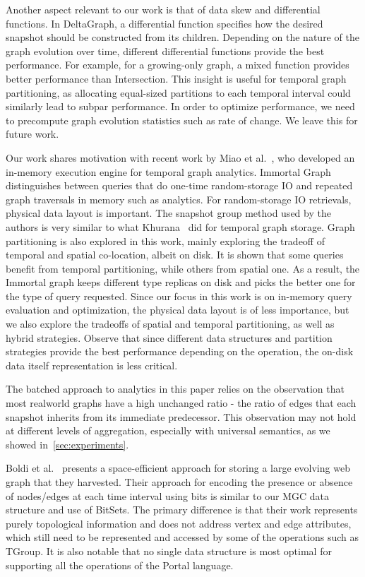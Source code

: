 Another aspect relevant to our work is that of data skew and
differential functions.  In DeltaGraph, a differential function
specifies how the desired snapshot should be constructed from its
children.  Depending on the nature of the graph evolution over time,
different differential functions provide the best performance.  For
example, for a growing-only graph, a mixed function provides better
performance than Intersection.  This insight is useful for temporal
graph partitioning, as allocating equal-sized partitions to each
temporal interval could similarly lead to subpar performance.  In order
to optimize performance, we need to precompute graph evolution
statistics such as rate of change.  We leave this for future
work. 

Our work shares motivation with recent work by Miao et
al.~\cite{DBLP:journals/tos/MiaoHLWYZPCC15}, who developed an
in-memory execution engine for temporal graph analytics.  Immortal
Graph distinguishes between queries that do one-time random-storage IO
and repeated graph traversals in memory such as analytics.  For
random-storage IO retrievals, physical data layout is important.  The
snapshot group method used by the authors is very similar to what
Khurana~\cite{Khurana2013} did for temporal graph storage.  Graph
partitioning is also explored in this work, mainly exploring the
tradeoff of temporal and spatial co-location, albeit on disk.  It is
shown that some queries benefit from temporal partitioning, while
others from spatial one.  As a result, the Immortal graph keeps
different type replicas on disk and picks the better one for the type
of query requested.  Since our focus in this work is on in-memory
query evaluation and optimization, the physical data layout is of less
importance, but we also explore the tradeoffs of spatial and temporal
partitioning, as well as hybrid strategies.  Observe that since
different data structures and partition strategies provide the best
performance depending on the operation, the on-disk data
itself representation is less critical.

The batched approach to analytics in this paper relies on the
observation that most realworld graphs have a high unchanged ratio -
the ratio of edges that each snapshot inherits from its immediate
predecessor.  This observation may not hold at different levels of
aggregation, especially with universal semantics, as we showed
in~\ref{sec:experiments}.

Boldi et al.~\cite{Boldi2008} presents a space-efficient approach for
storing a large evolving web graph that they harvested.  Their
approach for encoding the presence or absence of nodes/edges at each
time interval using bits is similar to our MGC data structure and use
of BitSets.  The primary difference is that their work represents
purely topological information and does not address vertex and edge
attributes, which still need to be represented and accessed by some of
the operations such as TGroup.  It is also notable that no single data
structure is most optimal for supporting all the operations of the
Portal language.

